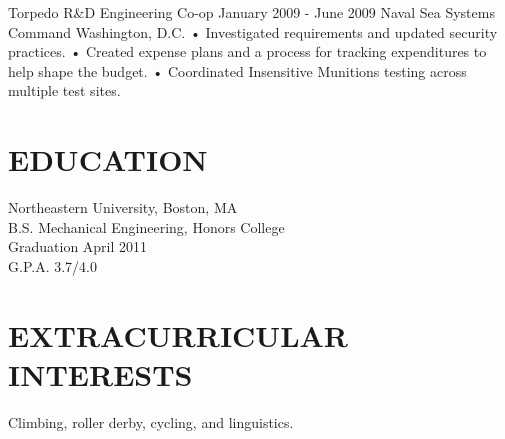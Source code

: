\documentclass{res}
\begin{document}
\begin{resume}
Torpedo R\&D Engineering Co-op
January 2009 - June 2009
Naval Sea Systems Command
Washington, D.C.
• Investigated requirements and updated security practices.
• Created expense plans and a process for tracking expenditures to help shape the budget.
• Coordinated Insensitive Munitions testing across multiple test sites.

\section{EDUCATION}
    Northeastern University, Boston, MA \\
    B.S. Mechanical Engineering, Honors College \\
    Graduation April 2011 \\
    G.P.A. 3.7/4.0

\section{EXTRACURRICULAR INTERESTS}
    Climbing, roller derby, cycling, and linguistics.

\end{resume}
\end{document}
